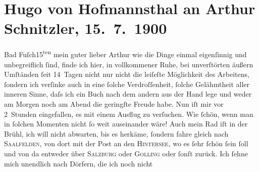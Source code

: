 

         
         \renewcommand{\erwaehntePersonen}{Personen: Richard Beer-Hofmann, Hugo August von Hofmannsthal, Anna von Hofmannsthal}
         \renewcommand{\erwaehnteOrte}{Orte: Bad Fusch, Brühl, Golling, Hintersee, Saalfelden am Steinernen Meer, Salzburg, Wien}
         \renewcommand{\erwaehnteWerke}{}
               \section[Hugo von Hofmannsthal an Arthur Schnitzler, 15. 7. 1900]{ Hugo von Hofmannsthal an Arthur Schnitzler, 15. 7. 1900}\nopagebreak{}\rehead{ }\begin{ledgroupsized}[t]{13cm}\normalsize\beginnumbering \toendnotes[C]{\smallbreak\pagebreak[2]} 
\toendnotes[C]{\smallbreak}\pstart
           \raggedleft{}{\pb}Bad Fuſch15\textsuperscript{ten}\pend
           \pstart{}mein guter lieber Arthur\pend\pstart
           wie die Dinge einmal eigenſinnig und unbegreiflich ſind, finde ich hier, in
               vollkommener Ruhe, bei unverſtörten äußern Umſtänden ſeit 14 Tagen nicht nur nicht
               die leiſeſte Möglichkeit des Arbeitens, ſondern ich verſinke auch in eine ſolche
               Verdroſſenheit, ſolche Gelähmtheit aller inneren Sinne, {\pb}daſs ich ein Buch nach dem andern
               aus der Hand lege und weder am Morgen noch am Abend die geringſte Freude habe. Nun
               iſt mir vor 2 Stunden eingefallen, es mit einem Ausflug zu verſuchen. Wie ſchön, wenn
               man in ſolchen Momenten nicht ſo weit auseinander wäre! Auch mein Rad iſt in der {\pb}Brühl, ich will nicht abwarten, bis es herkäme,
               ſondern fahre gleich nach \textsc{Saalfelden}, von dort mit der Post an den \textsc{Hintersee}, wo es ſehr ſchön ſein ſoll und von da entweder über \textsc{Salzburg} oder \textsc{Golling} oder ſonſt zurück. Ich ſehne mich unendlich nach Dörfern, die ich noch nicht

\end{ledgroupsized}
